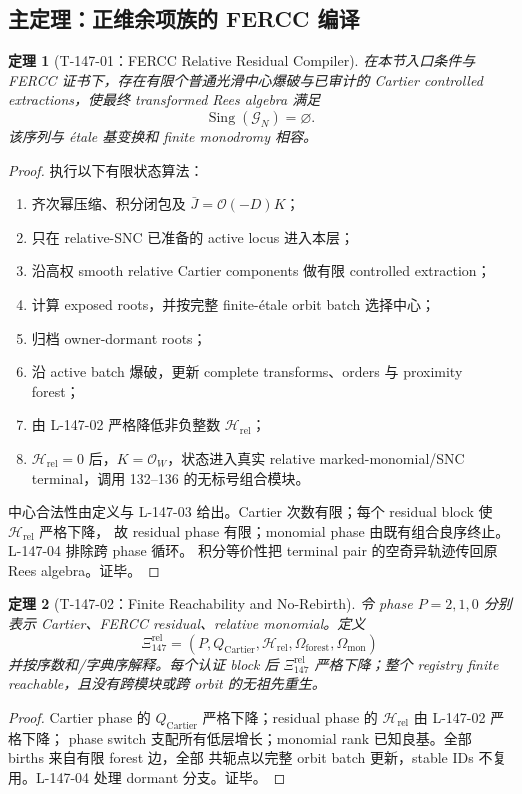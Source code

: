 \documentclass[11pt,a4paper,fontset=fandol]{ctexart}
\newtheorem{theorem}{定理}[section]
\newcommand{\Sing}{\operatorname{Sing}}
\newcommand{\Hrel}{\mathscr H_{\mathrm{rel}}}
\newcommand{\cO}{\mathcal O}
\newcommand{\G}{\mathcal G}
\begin{document}
\subsection{主定理：正维余项族的 FERCC 编译}
\begin{theorem}[T-147-01：FERCC Relative Residual Compiler]
在本节入口条件与 FERCC 证书下，存在有限个普通光滑中心爆破与已审计的 Cartier controlled
extractions，使最终 transformed Rees algebra 满足
\[
\boxed{\Sing(\G_N)=\varnothing.}
\]
该序列与 étale 基变换和 finite monodromy 相容。
\end{theorem}
\begin{proof}
执行以下有限状态算法：
\begin{enumerate}
\item 齐次幂压缩、积分闭包及 $\bar J=\cO(-D)K$；
\item 只在 relative-SNC 已准备的 active locus 进入本层；
\item 沿高权 smooth relative Cartier components 做有限 controlled extraction；
\item 计算 exposed roots，并按完整 finite-étale orbit batch 选择中心；
\item 归档 owner-dormant roots；
\item 沿 active batch 爆破，更新 complete transforms、orders 与 proximity forest；
\item 由 L-147-02 严格降低非负整数 $\Hrel$；
\item $\Hrel=0$ 后，$K=\cO_W$，状态进入真实 relative marked-monomial/SNC terminal，调用
132--136 的无标号组合模块。
\end{enumerate}
中心合法性由定义与 L-147-03 给出。Cartier 次数有限；每个 residual block 使 $\Hrel$ 严格下降，
故 residual phase 有限；monomial phase 由既有组合良序终止。L-147-04 排除跨 phase 循环。
积分等价性把 terminal pair 的空奇异轨迹传回原 Rees algebra。证毕。
\end{proof}

\begin{theorem}[T-147-02：Finite Reachability and No-Rebirth]
令 phase $P=2,1,0$ 分别表示 Cartier、FERCC residual、relative monomial。定义
\[
\Xi_{147}^{\mathrm{rel}}
=(P,Q_{\mathrm{Cartier}},\Hrel,\Omega_{\mathrm{forest}},\Omega_{\mathrm{mon}})
\]
并按序数和/字典序解释。每个认证 block 后 $\Xi_{147}^{\mathrm{rel}}$ 严格下降；整个 registry
finite reachable，且没有跨模块或跨 orbit 的无祖先重生。
\end{theorem}
\begin{proof}
Cartier phase 的 $Q_{\mathrm{Cartier}}$ 严格下降；residual phase 的 $\Hrel$ 由 L-147-02 严格下降；
phase switch 支配所有低层增长；monomial rank 已知良基。全部 births 来自有限 forest 边，全部
共轭点以完整 orbit batch 更新，stable IDs 不复用。L-147-04 处理 dormant 分支。证毕。
\end{proof}
\end{document}
